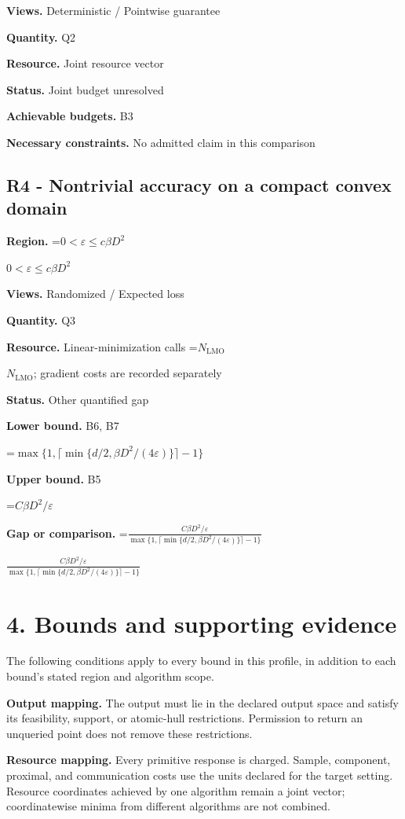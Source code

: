 \documentclass[10pt,a4paper]{article}
\newcommand{\AtlasMath}[1]{\par\begingroup\centering\setbox0=\hbox{$\displaystyle #1$}\ifdim\wd0>1.4\linewidth\typeout{ATLAS WIDE FORMULA: \the\wd0}\fi\ifdim\wd0>\linewidth\resizebox{\linewidth}{!}{\box0}\else\box0\fi\par\endgroup}
\newcommand{\AtlasInlineMath}[1]{\begingroup\setbox0=\hbox{$#1$}\ifdim\wd0>.4\linewidth\endgroup\AtlasMath{#1}\else\endgroup$#1$\fi}
\begin{document}
\textbf{Views.} Deterministic / Pointwise guarantee

\textbf{Quantity.} Q2

\textbf{Resource.} Joint resource vector

\textbf{Status.} Joint budget unresolved

\textbf{Achievable budgets.} B3

\textbf{Necessary constraints.} No admitted claim in this comparison

\subsection{R4 - Nontrivial accuracy on a compact convex domain}
\textbf{Region.} \AtlasInlineMath{0<\varepsilon\le c\beta D^2}

\textbf{Views.} Randomized / Expected loss

\textbf{Quantity.} Q3

\textbf{Resource.} Linear-minimization calls \AtlasInlineMath{N_{\mathrm{LMO}}}; gradient costs are recorded separately

\textbf{Status.} Other quantified gap

\textbf{Lower bound.} B6, B7

\AtlasMath{\max\{1,\lceil\min\{d/2,\beta D^2/(4\varepsilon)\}\rceil-1\}}
\textbf{Upper bound.} B5

\AtlasMath{C\beta D^2/\varepsilon}
\textbf{Gap or comparison.} \AtlasInlineMath{\frac{C\beta D^2/\varepsilon}{\max\{1,\lceil\min\{d/2,\beta D^2/(4\varepsilon)\}\rceil-1\}}}

\section{4. Bounds and supporting evidence}
The following conditions apply to every bound in this profile, in addition to each bound's stated region and algorithm scope.

\textbf{Output mapping.} The output must lie in the declared output space and satisfy its feasibility, support, or atomic-hull restrictions. Permission to return an unqueried point does not remove these restrictions.

\textbf{Resource mapping.} Every primitive response is charged. Sample, component, proximal, and communication costs use the units declared for the target setting. Resource coordinates achieved by one algorithm remain a joint vector; coordinatewise minima from different algorithms are not combined.
\end{document}
